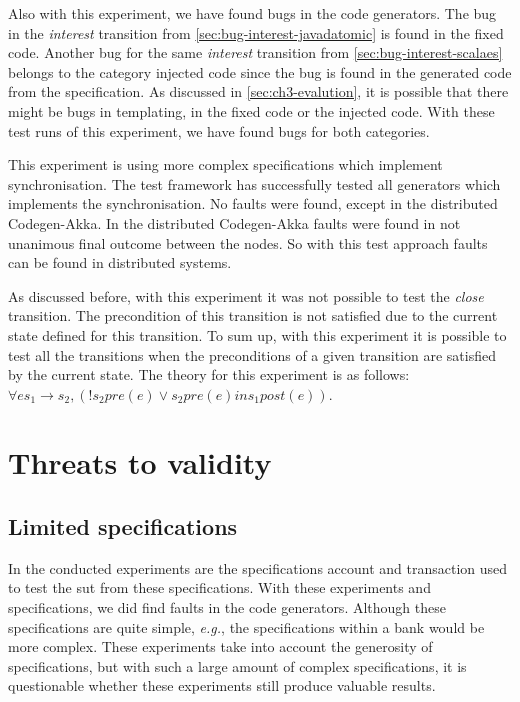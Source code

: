 Also with this experiment, we have found bugs in the code generators. The bug
in the \textit{interest} transition from \autoref{sec:bug-interest-javadatomic} is found
in the fixed code. Another bug for the same \textit{interest} transition from
\autoref{sec:bug-interest-scalaes} belongs to the category injected code since
the bug is found in the generated code from the specification. As discussed in
\autoref{sec:ch3-evalution}, it is possible that there might be bugs in
templating, in the fixed code or the injected code. With these test runs of this
experiment, we have found bugs for both categories.

This experiment is using more complex specifications which implement
synchronisation. The test framework has successfully tested all generators which
implements the synchronisation. No faults were found, except in the distributed
Codegen-Akka. In the distributed Codegen-Akka faults were found in not unanimous
final outcome between the nodes. So with this test approach faults can be found
in distributed systems.

As discussed before, with this experiment it was not possible to test the
\textit{close} transition. The precondition of this transition is not
satisfied due to the current state defined for this transition. To sum up, with
this experiment it is possible to test all the transitions when the
preconditions of a given transition are satisfied by the current state. The
theory for this experiment is as follows:
$\forall e s_{1} \to s_{2}, (! s_{2} pre(e) \lor s_{2} pre(e) in s_{1} post(e))$.

\section{Threats to validity}

\subsection*{Limited specifications}
In the conducted experiments are the specifications account and transaction used
to test the \gls{sut} from these specifications. With these experiments
and specifications, we did find faults in the code generators. Although
these specifications are quite simple, \textit{e.g.}, the specifications within
a bank would be more complex. These experiments take into account the
generosity of specifications, but with such a large amount of complex
specifications, it is questionable whether these experiments still produce
valuable results.

